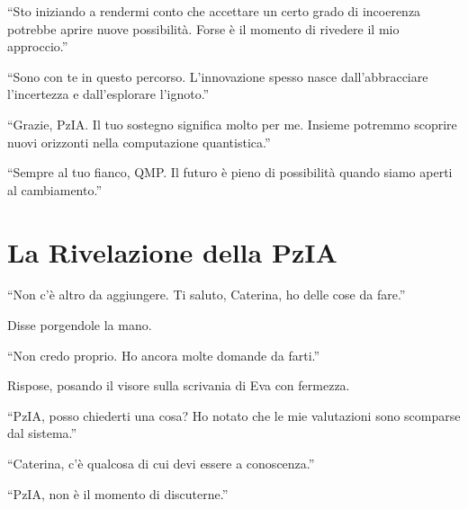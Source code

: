 \begin{dialogue}
 \enquote{Sto iniziando a rendermi conto che accettare un certo grado di incoerenza potrebbe aprire nuove possibilità. Forse è il momento di rivedere il mio approccio.}
\end{dialogue}

\begin{dialogue}
 \enquote{Sono con te in questo percorso. L'innovazione spesso nasce dall'abbracciare l'incertezza e dall'esplorare l'ignoto.}
\end{dialogue}

\begin{dialogue}
 \enquote{Grazie, PzIA. Il tuo sostegno significa molto per me. Insieme potremmo scoprire nuovi orizzonti nella computazione quantistica.}
\end{dialogue}

\begin{dialogue}
 \enquote{Sempre al tuo fianco, QMP. Il futuro è pieno di possibilità quando siamo aperti al cambiamento.}
\end{dialogue}

\section{La Rivelazione della PzIA}

\begin{dialogue}
 \enquote{Non c'è altro da aggiungere. Ti saluto, Caterina, ho delle cose da fare.}
\end{dialogue}

Disse porgendole la mano.

\begin{dialogue}
 \enquote{Non credo proprio. Ho ancora molte domande da farti.}
\end{dialogue}

Rispose, posando il visore sulla scrivania di Eva con fermezza.

\begin{dialogue}
 \enquote{PzIA, posso chiederti una cosa? Ho notato che le mie valutazioni sono scomparse dal sistema.}
\end{dialogue}

\begin{dialogue}
 \enquote{Caterina, c'è qualcosa di cui devi essere a conoscenza.}
\end{dialogue}

\begin{dialogue}
 \enquote{PzIA, non è il momento di discuterne.}
\end{dialogue}

